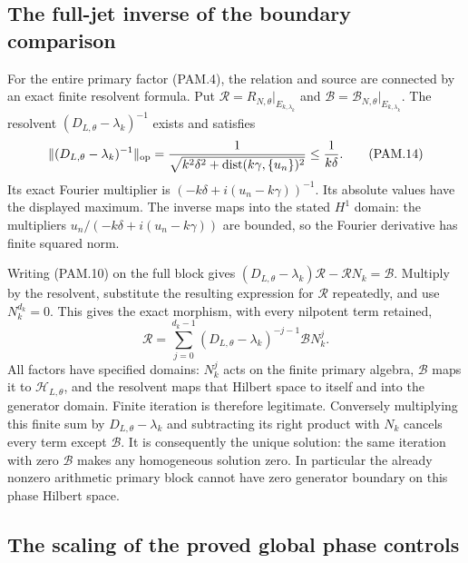 \subsection{The full-jet inverse of the boundary comparison}

For the entire primary factor (PAM.4), the relation and source are
connected by an exact finite resolvent formula. Put
\(\mathcal R=R_{N,\theta}|_{E_{k,\lambda_k}}\) and
\(\mathcal B=\mathscr B_{N,\theta}|_{E_{k,\lambda_k}}\).
The resolvent \((D_{L,\theta}-\lambda_k)^{-1}\) exists and satisfies
\[
 \|(D_{L,\theta}-\lambda_k)^{-1}\|_{\rm op}
 =\frac1{\sqrt{k^2\delta^2+
                 \operatorname{dist}(k\gamma,\{u_n\})^2}}
 \le\frac1{k\delta}.
 \tag{PAM.14}\label{eq:pam-resolvent}
\]
Its exact Fourier multiplier is
\((-k\delta+i(u_n-k\gamma))^{-1}\). Its absolute values have the
displayed maximum. The inverse maps into the stated \(H^1\) domain:
the multipliers \(u_n/(-k\delta+i(u_n-k\gamma))\) are bounded,
so the Fourier derivative has finite squared norm.

Writing (PAM.10) on the full block gives
\((D_{L,\theta}-\lambda_k)\mathcal R-\mathcal R N_k=\mathcal B\).
Multiply by the resolvent, substitute the resulting expression
for \(\mathcal R\) repeatedly, and use \(N_k^{d_k}=0\). This gives
the exact morphism, with every nilpotent term retained,
\[
 \boxed{\quad
 \mathcal R
 =\sum_{j=0}^{d_k-1}
       (D_{L,\theta}-\lambda_k)^{-j-1}\mathcal B N_k^j .
 \quad}
 \tag{PAM.15}\label{eq:pam-sylvester}
\]
All factors have specified domains: \(N_k^j\) acts on the finite
primary algebra, \(\mathcal B\) maps it to \(\mathcal H_{L,\theta}\),
and the resolvent maps that Hilbert space to itself and into the
generator domain. Finite iteration is therefore legitimate.
Conversely multiplying this finite sum by
\(D_{L,\theta}-\lambda_k\) and subtracting its right product with
\(N_k\) cancels every term except \(\mathcal B\).
It is consequently the unique solution: the same iteration with
zero \(\mathcal B\) makes any homogeneous solution zero.
In particular the already nonzero arithmetic primary block cannot
have zero generator boundary on this phase Hilbert space.

\subsection{The scaling of the proved global phase controls}

